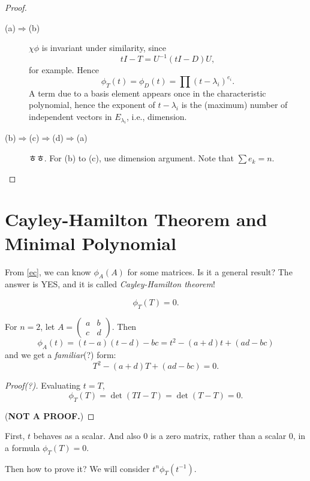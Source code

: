 \begin{proof}
\begin{description}
\item [(a)$\Rightarrow$(b)] $\chi\phi$ is invariant under similarity, since $$tI - T = U^{-1}(tI - D)U,$$for example. Hence $$\phi_T(t) = \phi_D(t) = \prod (t-\lambda_i)^{e_i}.$$ A term due to a basis element appears once in the characteristic polynomial, hence the exponent of $t-\lambda_i$ is the (maximum) number of independent vectors in $E_{\lambda_i}$, i.e., dimension.
\item [(b)$\Rightarrow$(c)$\Rightarrow$(d)$\Rightarrow$(a)] ㅎㅎ. For (b) to (c), use dimension argument. Note that $\sum e_k = n$.
\end{description}
\end{proof}

\section{Cayley-Hamilton Theorem and Minimal Polynomial}

From \cref{ec}, we can know $\phi_A (A)$ for some matrices. Is it a general result? The answer is \textsf{YES}, and it is called \textit{Cayley-Hamilton theorem}!
\begin{theorem} $$\phi_T(T)=0.$$\end{theorem}
For $n=2$, let $A = \begin{pmatrix}a&b\\c&d\end{pmatrix}.$ Then $$\phi_A(t) = (t-a)(t-d)-bc = t^2 - (a+d)t + (ad-bc)$$ and we get a \textit{familiar}(?) form: $$T^2 - (a+d)T + (ad-bc)=0.$$
\begin{proof}[Proof(?)] Evaluating $t=T$, $$\phi_T(T) = \det(TI-T) = \det(T-T) = 0.$$

(\textbf{NOT A PROOF.}) \renewcommand{\qedsymbol}{$\lightning$}
\end{proof}
First, $t$ behaves as a scalar. And also $0$ is a zero matrix, rather than a scalar 0, in a formula $\phi_T(T)=0.$

Then how to prove it? We will consider $t^n \phi_T(t^{-1})$.

